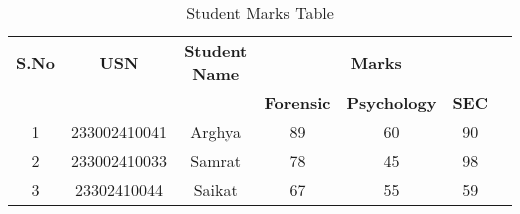 \documentclass{article}
\begin{document}
\begin{table}[h]
\centering
\begin{tabular}{|c|c|c|c|c|c|c|}
\hline
\textbf{S.No} & \textbf{USN} & \textbf{Student Name} & \multicolumn{3}{c|}{\textbf{Marks}} \\ \cline{4-6}
              &              &                       & \textbf{Forensic} & \textbf{Psychology} & \textbf{SEC} \\ \hline
1             & 233002410041   & Arghya               & 89                & 60                & 90                \\ \hline
2             & 233002410033   & Samrat                 & 78                & 45                & 98                \\ \hline
3             & 23302410044   & Saikat                 & 67                & 55                & 59                \\ \hline
\end{tabular}
\caption{Student Marks Table}
\end{table}
\end{document}
